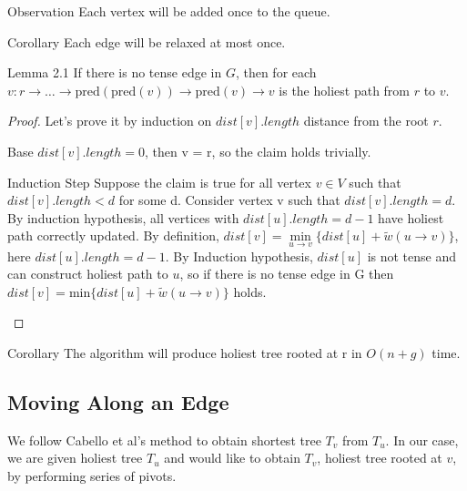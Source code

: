 \documentclass{article}
\begin{document}
\begin{oneshot}{Observation}
Each vertex will be added once to the queue.
\end{oneshot}

\begin{oneshot}{Corollary}
Each edge will be relaxed at most once.
\end{oneshot}

\begin{oneshot}{Lemma 2.1}
If there is no tense edge in $G$, then for each 
$v: r \rightarrow \ldots \rightarrow \text{pred}(\text{pred}(v)) \rightarrow 
\text{pred}(v) \rightarrow v$ is the holiest path from $r$ to $v$.
\end{oneshot}
\begin{proof}
Let's prove it by induction on $dist[v].length$ distance from the root
$r$.
\begin{oneshot}{Base}
$dist[v].length = 0$, then v = r, so the claim holds trivially.
\end{oneshot}

\begin{oneshot}{Induction Step}
Suppose the claim is true for all vertex $v \in V$ 
such that $dist[v].length < d$ for some d. Consider vertex v such that 
$dist[v].length=d$. By induction hypothesis, all vertices with 
$dist[u].length = d-1$ have holiest path 
correctly updated. By definition, $dist[v] = \min\limits_{u \rightarrow v}\{
dist[u] + \tilde w(u \rightarrow v)\}$, here $dist[u].length = d-1$. 
By Induction hypothesis, $dist[u]$ is not tense and can construct holiest 
path to $u$, so if there is no tense edge in G then 
$dist[v] = \text{min}\{dist[u] + \tilde w(u \rightarrow v)\}$ 
holds.
\end{oneshot}
\end{proof}

\begin{oneshot}{Corollary}
The algorithm will produce holiest tree rooted at r in $O(n + g)$ time.
\end{oneshot}

\subsection{Moving Along an Edge}

We follow Cabello et al's \cite{cabello2013multiple}
method to obtain shortest tree $T_v$ from $T_u$. In our case, we are given holiest tree $T_u$ and would like to obtain $T_v$, holiest tree rooted at $v$, by performing series of pivots.\\
\end{document}
